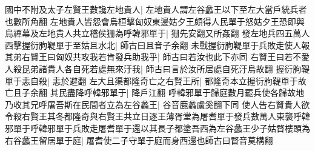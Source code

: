 國中不附及太子左賢王數讒左地貴人|{
	左地貴人謂左谷蠡王以下至左大當戶統兵者也數所角翻}
左地貴人皆怨會烏桓擊匈奴東邊姑夕王頗得人民單于怒姑夕王恐即與烏禪幕及左地貴人共立稽侯㹪為呼韓邪單于|{
	㹪先安翻又所姦翻}
發左地兵四五萬人西擊握衍朐鞮單于至姑且水北|{
	師古曰且音子余翻}
未戰握衍朐鞮單于兵敗走使人報其弟右賢王曰匈奴共攻我若肯發兵助我乎|{
	師古曰若汝也此下亦同}
右賢王曰若不愛人殺昆弟諸貴人各自死若處無來汙我|{
	師古曰言於汝所居處自死汙烏故翻}
握衍朐鞮單于恚自殺|{
	恚於避翻}
左大且渠都隆奇亡之右賢王所|{
	都隆奇本立握衍朐鞮單于故亡且子余翻}
其民盡降呼韓邪單于|{
	降戶江翻}
呼韓邪單于歸庭數月罷兵使各歸故地乃收其兄呼屠吾斯在民間者立為左谷蠡王|{
	谷音鹿蠡盧奚翻下同}
使人告右賢貴人欲令殺右賢王其冬都隆奇與右賢王共立日逐王薄胥堂為屠耆單于發兵數萬人東襲呼韓邪單于呼韓邪單于兵敗走屠耆單于還以其長子都塗吾西為左谷蠡王少子姑瞀樓頭為右谷蠡王留居單于庭|{
	屠耆使二子守單于庭而身西還也師古曰瞀音莫構翻}



